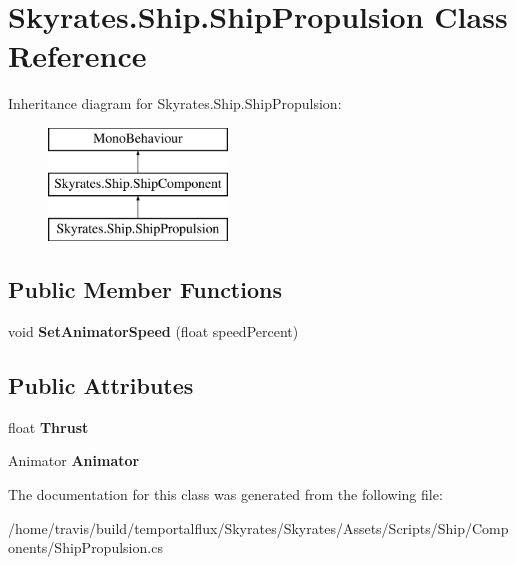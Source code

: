 \hypertarget{class_skyrates_1_1_ship_1_1_ship_propulsion}{\section{Skyrates.\-Ship.\-Ship\-Propulsion Class Reference}
\label{class_skyrates_1_1_ship_1_1_ship_propulsion}
}
Inheritance diagram for Skyrates.\-Ship.\-Ship\-Propulsion\-:\begin{figure}[H]
\begin{center}
\leavevmode
\includegraphics[height=3.000000cm]{class_skyrates_1_1_ship_1_1_ship_propulsion}
\end{center}
\end{figure}
\subsection*{Public Member Functions}
\begin{DoxyCompactItemize}
\item 
\hypertarget{class_skyrates_1_1_ship_1_1_ship_propulsion_a11ae5601abe2485e6f1d84f05c8d4385}{void {\bfseries Set\-Animator\-Speed} (float speed\-Percent)}\label{class_skyrates_1_1_ship_1_1_ship_propulsion_a11ae5601abe2485e6f1d84f05c8d4385}

\end{DoxyCompactItemize}
\subsection*{Public Attributes}
\begin{DoxyCompactItemize}
\item 
\hypertarget{class_skyrates_1_1_ship_1_1_ship_propulsion_a033380ef96b731ad623865506dfb702e}{float {\bfseries Thrust}}\label{class_skyrates_1_1_ship_1_1_ship_propulsion_a033380ef96b731ad623865506dfb702e}

\item 
\hypertarget{class_skyrates_1_1_ship_1_1_ship_propulsion_a9fa065f7ae920126fb34ac6c64724a32}{Animator {\bfseries Animator}}\label{class_skyrates_1_1_ship_1_1_ship_propulsion_a9fa065f7ae920126fb34ac6c64724a32}

\end{DoxyCompactItemize}


The documentation for this class was generated from the following file\-:\begin{DoxyCompactItemize}
\item 
/home/travis/build/temportalflux/\-Skyrates/\-Skyrates/\-Assets/\-Scripts/\-Ship/\-Components/Ship\-Propulsion.\-cs\end{DoxyCompactItemize}
